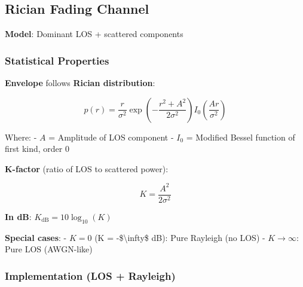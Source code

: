 \subsection{Rician Fading Channel}\label{rician-fading-channel}

\textbf{Model}: Dominant LOS + scattered components

\subsubsection{Statistical Properties}\label{statistical-properties-1}

\textbf{Envelope} follows \textbf{Rician distribution}:

\[
p(r) = \frac{r}{\sigma^2} \exp\left(-\frac{r^2 + A^2}{2\sigma^2}\right) I_0\left(\frac{Ar}{\sigma^2}\right)
\]

Where: - \(A\) = Amplitude of LOS component - \(I_0\) = Modified Bessel
function of first kind, order 0

\textbf{K-factor} (ratio of LOS to scattered power):

\[
K = \frac{A^2}{2\sigma^2}
\]

\textbf{In dB}: \(K_{\text{dB}} = 10\log_{10}(K)\)

\textbf{Special cases}: - \(K = 0\) (K = -\$\textbackslash infty\$ dB):
Pure Rayleigh (no LOS) - \(K \to \infty\): Pure LOS (AWGN-like)


\subsubsection{Implementation (LOS +
Rayleigh)}\label{implementation-los-rayleigh}

